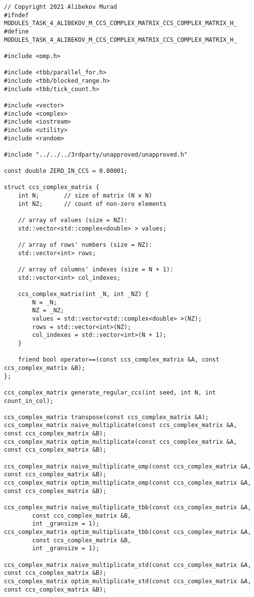 \documentclass{report}
\begin{document}
\begin{itemize}
\begin{itemize}
\begin{lstlisting}
// Copyright 2021 Alibekov Murad
#ifndef MODULES_TASK_4_ALIBEKOV_M_CCS_COMPLEX_MATRIX_CCS_COMPLEX_MATRIX_H_
#define MODULES_TASK_4_ALIBEKOV_M_CCS_COMPLEX_MATRIX_CCS_COMPLEX_MATRIX_H_

#include <omp.h>

#include <tbb/parallel_for.h>
#include <tbb/blocked_range.h>
#include <tbb/tick_count.h>

#include <vector>
#include <complex>
#include <iostream>
#include <utility>
#include <random>

#include "../../../3rdparty/unapproved/unapproved.h"

const double ZERO_IN_CCS = 0.00001;

struct ccs_complex_matrix {
    int N;       // size of matrix (N x N)
    int NZ;      // count of non-zero elements

    // array of values (size = NZ):
    std::vector<std::complex<double> > values;

    // array of rows' numbers (size = NZ):
    std::vector<int> rows;

    // array of columns' indexes (size = N + 1):
    std::vector<int> col_indexes;

    ccs_complex_matrix(int _N, int _NZ) {
        N = _N;
        NZ = _NZ;
        values = std::vector<std::complex<double> >(NZ);
        rows = std::vector<int>(NZ);
        col_indexes = std::vector<int>(N + 1);
    }

    friend bool operator==(const ccs_complex_matrix &A, const ccs_complex_matrix &B);
};

ccs_complex_matrix generate_regular_ccs(int seed, int N, int count_in_col);

ccs_complex_matrix transpose(const ccs_complex_matrix &A);
ccs_complex_matrix naive_multiplicate(const ccs_complex_matrix &A, const ccs_complex_matrix &B);
ccs_complex_matrix optim_multiplicate(const ccs_complex_matrix &A, const ccs_complex_matrix &B);

ccs_complex_matrix naive_multiplicate_omp(const ccs_complex_matrix &A, const ccs_complex_matrix &B);
ccs_complex_matrix optim_multiplicate_omp(const ccs_complex_matrix &A, const ccs_complex_matrix &B);

ccs_complex_matrix naive_multiplicate_tbb(const ccs_complex_matrix &A,
        const ccs_complex_matrix &B,
        int _gransize = 1);
ccs_complex_matrix optim_multiplicate_tbb(const ccs_complex_matrix &A,
        const ccs_complex_matrix &B,
        int _gransize = 1);

ccs_complex_matrix naive_multiplicate_std(const ccs_complex_matrix &A, const ccs_complex_matrix &B);
ccs_complex_matrix optim_multiplicate_std(const ccs_complex_matrix &A, const ccs_complex_matrix &B);


\end{lstlisting}
\end{itemize}
\end{itemize}
\end{document}
